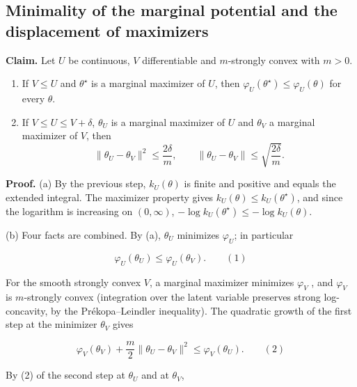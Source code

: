 \documentclass[11pt,a4paper]{report}
\begin{document}
\subsection{\texorpdfstring{Minimality of the marginal potential and the displacement of maximizers}{Minimality of the marginal potential and the displacement of maximizers}}
\label{report-step-ProximalLangevin-Perturbation-lean-4}


\textbf{Claim.} Let \(U\) be continuous, \(V\) differentiable and \(m\)-strongly convex with \(m>0\).



\begin{enumerate}


\item If \(V\le U\) and \(\theta^\star\) is a marginal maximizer of \(U\), then \(\varphi_U(\theta^\star)\le\varphi_U(\theta)\) for every \(\theta\).

\item If \(V\le U\le V+\delta\), \(\theta_U\) is a marginal maximizer of \(U\) and \(\theta_V\) a marginal maximizer of \(V\), then
\[\|\theta_U-\theta_V\|^2\le\frac{2\delta}m,\qquad\|\theta_U-\theta_V\|\le\sqrt{\frac{2\delta}m}.\]

\end{enumerate}



\textbf{Proof.} (a) By the previous step, \(k_U(\theta)\) is finite and positive and equals the extended integral. The maximizer property gives \(k_U(\theta)\le k_U(\theta^\star)\), and since the logarithm is increasing on \((0,\infty)\), \(-\log k_U(\theta^\star)\le-\log k_U(\theta)\).




(b) Four facts are combined. By (a), \(\theta_U\) minimizes \(\varphi_U\); in particular


\[\varphi_U(\theta_U)\le\varphi_U(\theta_V).\qquad(1)\]


For the smooth strongly convex \(V\), a marginal maximizer minimizes \(\varphi_V\) \cite[Section~3.12.1]{LangevinLean2026IPLA}, and \(\varphi_V\) is \(m\)-strongly convex \cite[Section~3.12.3]{LangevinLean2026IPLA} (integration over the latent variable preserves strong log-concavity, by the Prékopa–Leindler inequality). The quadratic growth of the first step at the minimizer \(\theta_V\) gives


\[\varphi_V(\theta_V)+\frac m2\|\theta_U-\theta_V\|^2\le\varphi_V(\theta_U).\qquad(2)\]


By (2) of the second step at \(\theta_U\) and at \(\theta_V\),
\end{document}
